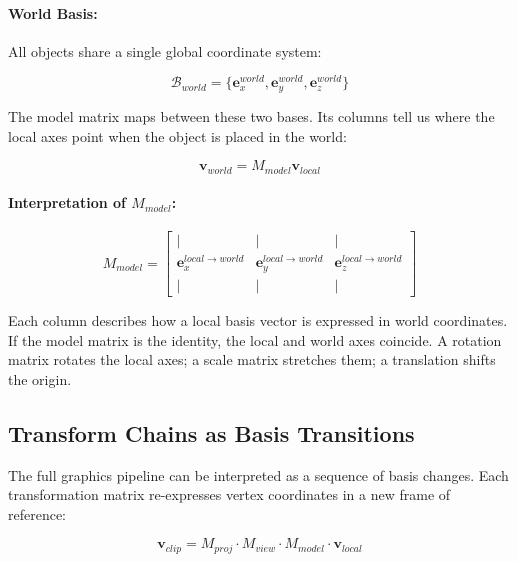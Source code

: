 \documentclass[11pt]{article}
\begin{document}
\paragraph{World Basis:}

All objects share a single global coordinate system:

\begin{equation}
    \mathcal{B}_{world} =
    \{\mathbf{e}_x^{world}, \mathbf{e}_y^{world}, \mathbf{e}_z^{world}\}
\end{equation}

The model matrix maps between these two bases. Its columns tell us where the local axes point when the object is placed in the world:

\begin{equation}
    \mathbf{v}_{world} = M_{model} \mathbf{v}_{local}
\end{equation}

\paragraph{Interpretation of $M_{model}$:}

\begin{equation}
    M_{model} =
    \begin{bmatrix}
        | & | & | \\
        \mathbf{e}_x^{local \rightarrow world} &
        \mathbf{e}_y^{local \rightarrow world} &
        \mathbf{e}_z^{local \rightarrow world} \\
        | & | & |
    \end{bmatrix}
\end{equation}

Each column describes how a local basis vector is expressed in world coordinates. If the model matrix is the identity, the local and world axes coincide. A rotation matrix rotates the local axes; a scale matrix stretches them; a translation shifts the origin.

\subsection{Transform Chains as Basis Transitions}

The full graphics pipeline can be interpreted as a sequence of basis changes. Each transformation matrix re-expresses vertex coordinates in a new frame of reference:

\begin{equation}
    \mathbf{v}_{clip} =
    M_{proj} \cdot M_{view} \cdot M_{model} \cdot \mathbf{v}_{local}
\end{equation}
\end{document}
